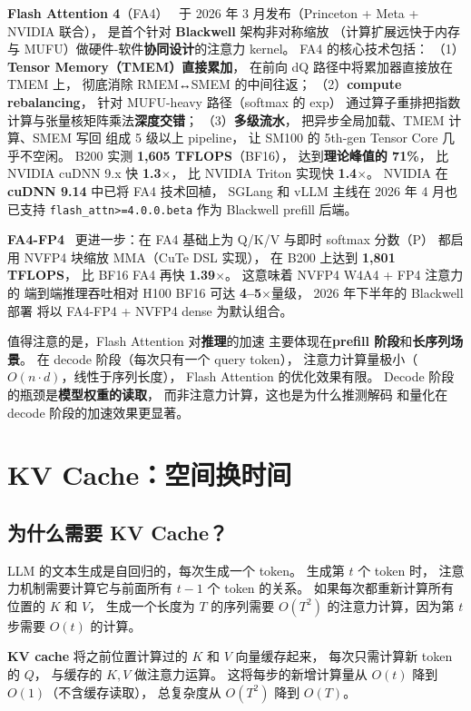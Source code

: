 \textbf{Flash Attention 4}（FA4）~\cite{fa4_2026}
于 2026 年 3 月发布（Princeton + Meta + NVIDIA 联合），
是首个针对 \textbf{Blackwell} 架构非对称缩放
（计算扩展远快于内存与 MUFU）做硬件-软件\textbf{协同设计}的注意力 kernel。
FA4 的核心技术包括：
（1）\textbf{Tensor Memory（TMEM）直接累加}，
在前向 dQ 路径中将累加器直接放在 TMEM 上，
彻底消除 RMEM↔SMEM 的中间往返；
（2）\textbf{compute rebalancing}，
针对 MUFU-heavy 路径（softmax 的 exp）
通过算子重排把指数计算与张量核矩阵乘法\textbf{深度交错}；
（3）\textbf{多级流水}，
把异步全局加载、TMEM 计算、SMEM 写回
组成 5 级以上 pipeline，
让 SM100 的 5th-gen Tensor Core 几乎不空闲。
B200 实测 \textbf{1{,}605 TFLOPS}（BF16），
达到\textbf{理论峰值的 71\%}，
比 NVIDIA cuDNN 9.x 快 \textbf{1.3$\times$}，
比 NVIDIA Triton 实现快 \textbf{1.4$\times$}。
NVIDIA 在 \textbf{cuDNN 9.14} 中已将 FA4 技术回植，
SGLang 和 vLLM 主线在 2026 年 4 月也已支持
\texttt{flash\_attn>=4.0.0.beta} 作为 Blackwell prefill 后端。

\textbf{FA4-FP4}~\cite{fa4fp4_2026}
更进一步：在 FA4 基础上为 Q/K/V 与即时 softmax 分数（P）
都启用 NVFP4 块缩放 MMA（CuTe DSL 实现），
在 B200 上达到 \textbf{1{,}801 TFLOPS}，
比 BF16 FA4 再快 \textbf{1.39$\times$}。
这意味着 NVFP4 W4A4 + FP4 注意力的
端到端推理吞吐相对 H100 BF16 可达 \textbf{4--5$\times$}量级，
2026 年下半年的 Blackwell 部署
将以 FA4-FP4 + NVFP4 dense 为默认组合。

值得注意的是，Flash Attention 对\textbf{推理}的加速
主要体现在\textbf{prefill 阶段}和\textbf{长序列场景}。
在 decode 阶段（每次只有一个 query token），
注意力计算量极小（$O(n \cdot d)$，线性于序列长度），
Flash Attention 的优化效果有限。
Decode 阶段的瓶颈是\textbf{模型权重的读取}，
而非注意力计算，这也是为什么推测解码
和量化在 decode 阶段的加速效果更显著。


\section{KV Cache：空间换时间}

\subsection{为什么需要 KV Cache？}

LLM 的文本生成是自回归的，每次生成一个 token。
生成第 $t$ 个 token 时，
注意力机制需要计算它与前面所有 $t-1$ 个 token 的关系。
如果每次都重新计算所有位置的 $K$ 和 $V$，
生成一个长度为 $T$ 的序列需要
$O(T^2)$ 的注意力计算，因为第 $t$ 步需要 $O(t)$ 的计算。

\textbf{KV cache} 将之前位置计算过的 $K$ 和 $V$ 向量缓存起来，
每次只需计算新 token 的 $Q$，
与缓存的 $K, V$ 做注意力运算。
这将每步的新增计算量从 $O(t)$ 降到 $O(1)$（不含缓存读取），
总复杂度从 $O(T^2)$ 降到 $O(T)$。

